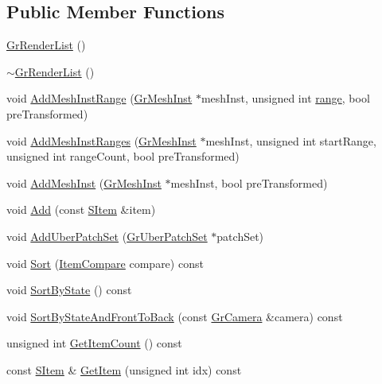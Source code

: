 \subsection*{Public Member Functions}
\begin{CompactItemize}
\item 
\hyperlink{class_gr_render_list_23445a325c6f38273706c3240eaa380c}{GrRenderList} ()
\item 
\hyperlink{class_gr_render_list_1c34dff29f644328255decc5059f4b17}{$\sim$GrRenderList} ()
\item 
void \hyperlink{class_gr_render_list_7f49dae7c01019fc472c1a6eb4c0c7f2}{AddMeshInstRange} (\hyperlink{class_gr_mesh_inst}{GrMeshInst} $\ast$meshInst, unsigned int \hyperlink{glext__bak_8h_7b8ad0b27a927682837f95528fa454f5}{range}, bool preTransformed)
\item 
void \hyperlink{class_gr_render_list_be7569ef61ce1cc020a454da4bcf3c41}{AddMeshInstRanges} (\hyperlink{class_gr_mesh_inst}{GrMeshInst} $\ast$meshInst, unsigned int startRange, unsigned int rangeCount, bool preTransformed)
\item 
void \hyperlink{class_gr_render_list_2092d2e20fd57bb03c5090684201530c}{AddMeshInst} (\hyperlink{class_gr_mesh_inst}{GrMeshInst} $\ast$meshInst, bool preTransformed)
\item 
void \hyperlink{class_gr_render_list_28b4f24b9d4225c66460c7d6bfe0ed1c}{Add} (const \hyperlink{struct_gr_render_list_1_1_s_item}{SItem} \&item)
\item 
void \hyperlink{class_gr_render_list_43ea9830b9dfd7e1d71f94145016ccd8}{AddUberPatchSet} (\hyperlink{class_gr_uber_patch_set}{GrUberPatchSet} $\ast$patchSet)
\item 
void \hyperlink{class_gr_render_list_6f56335d85f1e66ffcef3c202156ec0b}{Sort} (\hyperlink{class_gr_render_list_8456ff8c0733596672fc7181c7838996}{ItemCompare} compare) const 
\item 
void \hyperlink{class_gr_render_list_33be395e2030cfadc8cee57f55e53b90}{SortByState} () const 
\item 
void \hyperlink{class_gr_render_list_a76c47e8612241e67759640fae1cadca}{SortByStateAndFrontToBack} (const \hyperlink{class_gr_camera}{GrCamera} \&camera) const 
\item 
unsigned int \hyperlink{class_gr_render_list_eb7629d3dfeedc0b4506fe89805626ca}{GetItemCount} () const 
\item 
const \hyperlink{struct_gr_render_list_1_1_s_item}{SItem} \& \hyperlink{class_gr_render_list_804dda30bc32373cf54e59cb6442bc53}{GetItem} (unsigned int idx) const 

\end{CompactItemize}
